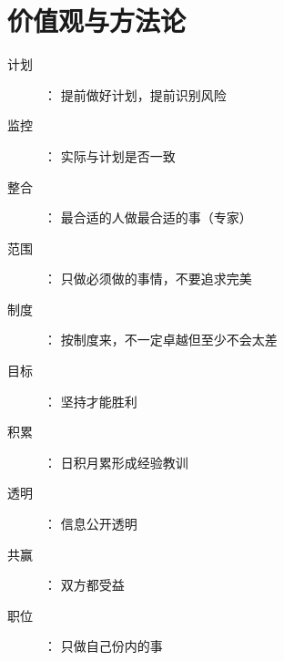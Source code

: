 
\chapter{价值观与方法论}

\begin{description}

\item [计划]： 提前做好计划，提前识别风险
\item [监控]： 实际与计划是否一致
\item [整合]： 最合适的人做最合适的事（专家）
\item [范围]： 只做必须做的事情，不要追求完美
\item [制度]： 按制度来，不一定卓越但至少不会太差
\item [目标]： 坚持才能胜利
\item [积累]： 日积月累形成经验教训
\item [透明]： 信息公开透明
\item [共赢]： 双方都受益
\item [职位]： 只做自己份内的事
\end{description}

